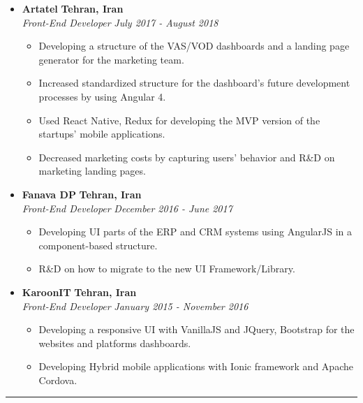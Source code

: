 \documentclass[10pt,letterpaper]{article}
\begin{document}
\begin{itemize}
     \item[]
    {\textbf{Artatel} \hfill
      \textbf{Tehran, Iran}}
    \\
    {\emph{Front-End Developer} \hfill \emph{July 2017 - August 2018}}
    \begin{itemize}[label=\textbullet]
      \itemsep0.5em
      \item Developing a structure of the VAS/VOD dashboards and a landing page generator for the marketing team.
      \item Increased standardized structure for the dashboard’s future development processes by using Angular 4.
      \item Used React Native, Redux for developing the MVP version of the startups' mobile applications.
      \item Decreased marketing costs by capturing users’ behavior and R\&D on marketing landing pages.

    \end{itemize}
    
    \item[]
    {\textbf{Fanava DP} \hfill
      \textbf{Tehran, Iran}}
    \\
    {\emph{Front-End Developer} \hfill \emph{December 2016 - June 2017}}
    \begin{itemize}[label=\textbullet]
      \itemsep0.5em
      \item Developing UI parts of the ERP and CRM systems using AngularJS in a component-based structure.
       \item R\&D on how to migrate to the new UI Framework/Library.
    \end{itemize}
    
    \item[]
    {\textbf{KaroonIT} \hfill
      \textbf{Tehran, Iran}}
    \\
    {\emph{Front-End Developer} \hfill \emph{January 2015 - November 2016}}
    \begin{itemize}[label=\textbullet]
      \itemsep0.5em
      \item Developing a responsive UI with VanillaJS and JQuery, Bootstrap for the websites and platforms dashboards.
       \item Developing Hybrid mobile applications with Ionic framework and Apache Cordova.
    \end{itemize}
\end{itemize}

\hrule
\vspace{-1.0em}
\end{document}
